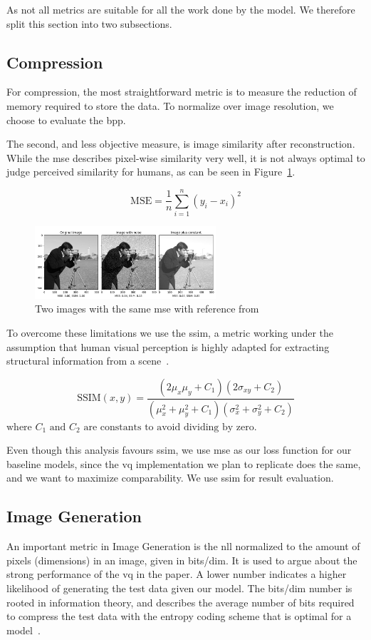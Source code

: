 As not all metrics are suitable for all the work done by the model.
We therefore split this section into two subsections.

\subsection{Compression}\label{subsec:compression}
For compression, the most straightforward metric is to measure the reduction of memory required to
store the data.
To normalize over image resolution, we choose to evaluate the \ac{bpp}.

The second, and less objective measure, is image similarity after reconstruction.
While the \ac{mse} describes pixel-wise similarity very well, it is not
always optimal to judge perceived similarity for humans, as can be seen in Figure~\ref{fig:mse_ssim}.

\[
\text{MSE} = \frac{1}{n} \sum_{i=1}^{n} (y_i - x_i)^2
\]

\begin{figure}[ht]
    \centering
    \includegraphics[width=0.6\textwidth]{images/ssim_mse}
    \caption{Two images with the same \ac{mse} with reference from~\cite{scikit-ssim}}
    \label{fig:mse_ssim}
\end{figure}

To overcome these limitations we use the \ac{ssim}, a metric working under the assumption that human visual
perception is highly adapted for extracting structural information from a scene~\cite{ssim}.

\[
\text{SSIM}(x, y) = \frac{(2\mu_x \mu_y + C_1)(2\sigma_{xy} + C_2)}{(\mu_x^2 + \mu_y^2 + C_1)(\sigma_x^2 + \sigma_y^2 + C_2)}
\]
$\text{where } C_1 \text{ and } C_2 \text{ are constants to avoid dividing by zero.}$


Even though this analysis favours \ac{ssim}, we use \ac{mse} as our loss function for our baseline models,
since the \ac{vq} implementation we plan to replicate does the same, and we want to maximize comparability.
We use \ac{ssim} for result evaluation.

\subsection{Image Generation}\label{subsec:image-generation}
An important metric in Image Generation is the \ac{nll} normalized to the amount of pixels (dimensions) in an image, given in bits/dim.
It is used to argue about the strong performance of the \ac{vq} in the paper.
A lower number indicates a higher likelihood of generating the test data given our model.
The bits/dim number is rooted in information theory, and describes the average number of bits required to
compress the test data with the entropy coding scheme that is optimal for a model~\cite{shannon}.

